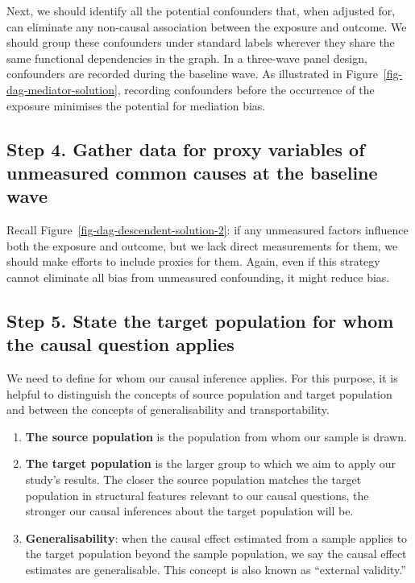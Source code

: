 \documentclass[
  singlecolumn]{report}
\begin{document}
Next, we should identify all the potential confounders that, when
adjusted for, can eliminate any non-causal association between the
exposure and outcome. We should group these confounders under standard
labels wherever they share the same functional dependencies in the
graph. In a three-wave panel design, confounders are recorded during the
baseline wave. As illustrated in Figure~\ref{fig-dag-mediator-solution},
recording confounders before the occurrence of the exposure minimises
the potential for mediation bias.

\hypertarget{step-4.-gather-data-for-proxy-variables-of-unmeasured-common-causes-at-the-baseline-wave}{%
\subsection{Step 4. Gather data for proxy variables of unmeasured common
causes at the baseline
wave}\label{step-4.-gather-data-for-proxy-variables-of-unmeasured-common-causes-at-the-baseline-wave}}

Recall Figure~\ref{fig-dag-descendent-solution-2}: if any unmeasured
factors influence both the exposure and outcome, but we lack direct
measurements for them, we should make efforts to include proxies for
them. Again, even if this strategy cannot eliminate all bias from
unmeasured confounding, it might reduce bias.

\hypertarget{step-5.-state-the-target-population-for-whom-the-causal-question-applies}{%
\subsection{Step 5. State the target population for whom the causal
question
applies}\label{step-5.-state-the-target-population-for-whom-the-causal-question-applies}}

We need to define for whom our causal inference applies. For this
purpose, it is helpful to distinguish the concepts of source population
and target population and between the concepts of generalisability and
transportability.

\begin{enumerate}
\def\labelenumi{\arabic{enumi}.}
\item
  \textbf{The source population} is the population from whom our sample
  is drawn.
\item
  \textbf{The target population} is the larger group to which we aim to
  apply our study's results. The closer the source population matches
  the target population in structural features relevant to our causal
  questions, the stronger our causal inferences about the target
  population will be.
\item
  \textbf{Generalisability}: when the causal effect estimated from a
  sample applies to the target population beyond the sample population,
  we say the causal effect estimates are generalisable. This concept is
  also known as ``external validity.''
\end{enumerate}
\end{document}
